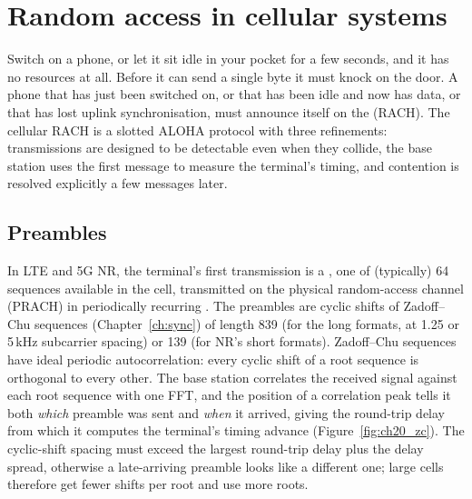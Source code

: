 \section{Random access in cellular systems}
\label{sec:ch20:rach}

Switch on a phone, or let it sit idle in your pocket for a few seconds, and it has no resources at all.
Before it can send a single byte it must knock on the door. A phone that has just been switched on, or that
has been idle and now has data, or that has lost uplink synchronisation, must announce itself on the
 (RACH). The cellular RACH is a slotted ALOHA protocol with three refinements:
transmissions are designed to be detectable even when they collide, the base station uses the first message
to measure the terminal's timing, and contention is resolved explicitly a few messages later.


\subsection{Preambles}

In LTE and 5G NR, the terminal's first transmission is a , one of (typically) 64 sequences
available in the cell, transmitted on the physical random-access channel (PRACH) in periodically recurring
. The preambles are cyclic shifts of Zadoff--Chu sequences (Chapter~\ref{ch:sync}) of
length 839 (for the long formats, at 1.25 or 5\,kHz subcarrier spacing) or 139 (for NR's short formats).
Zadoff--Chu sequences have ideal periodic autocorrelation: every cyclic shift of a root sequence is orthogonal
to every other. The base station correlates the received signal against each root sequence with one FFT, and
the position of a correlation peak tells it both \emph{which} preamble was sent and \emph{when} it arrived,
giving the round-trip delay from which it computes the terminal's timing advance
(Figure~\ref{fig:ch20_zc}). The cyclic-shift spacing must exceed the largest round-trip delay plus the delay
spread, otherwise a late-arriving preamble looks like a different one; large cells therefore get fewer shifts
per root and use more roots.

